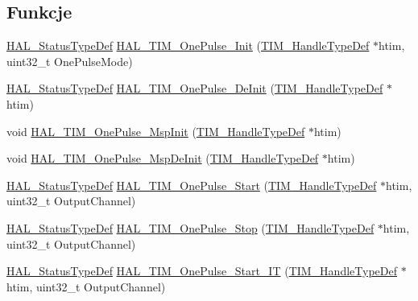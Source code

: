\subsection*{Funkcje}
\begin{DoxyCompactItemize}
\item 
\hyperlink{stm32f4xx__hal__def_8h_a63c0679d1cb8b8c684fbb0632743478f}{H\+A\+L\+\_\+\+Status\+Type\+Def} \hyperlink{group___t_i_m___exported___functions___group5_ga476d67a220c23ebdc69fac7b09dbaa72}{H\+A\+L\+\_\+\+T\+I\+M\+\_\+\+One\+Pulse\+\_\+\+Init} (\hyperlink{struct_t_i_m___handle_type_def}{T\+I\+M\+\_\+\+Handle\+Type\+Def} $\ast$htim, uint32\+\_\+t One\+Pulse\+Mode)
\item 
\hyperlink{stm32f4xx__hal__def_8h_a63c0679d1cb8b8c684fbb0632743478f}{H\+A\+L\+\_\+\+Status\+Type\+Def} \hyperlink{group___t_i_m___exported___functions___group5_gae60b468b11199522c6c83a943439c7b7}{H\+A\+L\+\_\+\+T\+I\+M\+\_\+\+One\+Pulse\+\_\+\+De\+Init} (\hyperlink{struct_t_i_m___handle_type_def}{T\+I\+M\+\_\+\+Handle\+Type\+Def} $\ast$htim)
\item 
void \hyperlink{group___t_i_m___exported___functions___group5_ga6579726753cb2b769a21d10bec75219f}{H\+A\+L\+\_\+\+T\+I\+M\+\_\+\+One\+Pulse\+\_\+\+Msp\+Init} (\hyperlink{struct_t_i_m___handle_type_def}{T\+I\+M\+\_\+\+Handle\+Type\+Def} $\ast$htim)
\item 
void \hyperlink{group___t_i_m___exported___functions___group5_ga9b73c7135e8348613f30f3a4d84478e7}{H\+A\+L\+\_\+\+T\+I\+M\+\_\+\+One\+Pulse\+\_\+\+Msp\+De\+Init} (\hyperlink{struct_t_i_m___handle_type_def}{T\+I\+M\+\_\+\+Handle\+Type\+Def} $\ast$htim)
\item 
\hyperlink{stm32f4xx__hal__def_8h_a63c0679d1cb8b8c684fbb0632743478f}{H\+A\+L\+\_\+\+Status\+Type\+Def} \hyperlink{group___t_i_m___exported___functions___group5_ga40e43e4f2484df59079e0316d6a6fd23}{H\+A\+L\+\_\+\+T\+I\+M\+\_\+\+One\+Pulse\+\_\+\+Start} (\hyperlink{struct_t_i_m___handle_type_def}{T\+I\+M\+\_\+\+Handle\+Type\+Def} $\ast$htim, uint32\+\_\+t Output\+Channel)
\item 
\hyperlink{stm32f4xx__hal__def_8h_a63c0679d1cb8b8c684fbb0632743478f}{H\+A\+L\+\_\+\+Status\+Type\+Def} \hyperlink{group___t_i_m___exported___functions___group5_gac7744a2a063e8bf2909319d70fc764fd}{H\+A\+L\+\_\+\+T\+I\+M\+\_\+\+One\+Pulse\+\_\+\+Stop} (\hyperlink{struct_t_i_m___handle_type_def}{T\+I\+M\+\_\+\+Handle\+Type\+Def} $\ast$htim, uint32\+\_\+t Output\+Channel)
\item 
\hyperlink{stm32f4xx__hal__def_8h_a63c0679d1cb8b8c684fbb0632743478f}{H\+A\+L\+\_\+\+Status\+Type\+Def} \hyperlink{group___t_i_m___exported___functions___group5_gafcde302725d20c6f992f26660d491bb9}{H\+A\+L\+\_\+\+T\+I\+M\+\_\+\+One\+Pulse\+\_\+\+Start\+\_\+\+IT} (\hyperlink{struct_t_i_m___handle_type_def}{T\+I\+M\+\_\+\+Handle\+Type\+Def} $\ast$htim, uint32\+\_\+t Output\+Channel)

\end{DoxyCompactItemize}
